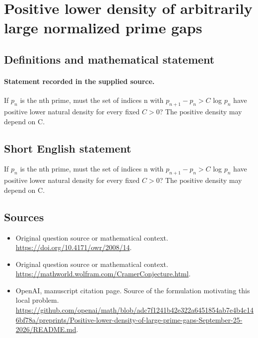 \documentclass[11pt]{article}
\begin{document}
\section*{Positive lower density of arbitrarily large normalized prime gaps}\label{statement}
\subsection{Definitions and mathematical statement}
\paragraph{Statement recorded in the supplied source.}
If $p_n$ is the nth prime, must the set of indices n with $p_{n+1}-p_n>C$ log $p_n$ have positive lower natural density for every fixed $C>0$? The positive density may depend on C.
\subsection{Short English statement}
If $p_n$ is the nth prime, must the set of indices n with $p_{n+1}-p_n>C$ log $p_n$ have positive lower natural density for every fixed $C>0$? The positive density may depend on C.
\subsection{Sources}
\begin{itemize}
\item[S1] Original question source or mathematical context.
\url{https://doi.org/10.4171/owr/2008/14}.
\item[S2] Original question source or mathematical context.
\url{https://mathworld.wolfram.com/CramerConjecture.html}.
\item[S3] OpenAI, manuscript citation page. Source of the formulation motivating this local problem.
\url{https://github.com/openai/math/blob/adc7f1241b42e322a6451854ab7e4b4c146bf78a/preprints/Positive-lower-density-of-large-prime-gaps-September-25-2026/README.md}.
\end{itemize}
\end{document}
